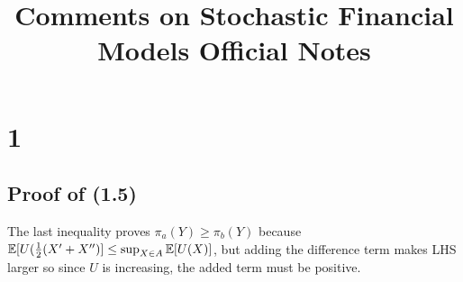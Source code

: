 \documentclass[a4paper]{article}
\begin{document}
\title{Comments on Stochastic Financial Models Official Notes}

\maketitle

\newpage

\tableofcontents

\newpage

\section{1}
\subsection{Proof of (1.5)}
The last inequality proves $\pi_a(Y) \geq \pi_b(Y)$ because $\mathbb{E}[U(\frac{1}{2}(X'+X'')] \leq \sup_{X \in A} \mathbb{E}[U(X)]$, but adding the difference term makes LHS larger so since $U$ is increasing, the added term must be positive.



\iffalse
\begin{equation*}
\begin{aligned}

\end{aligned}
\end{equation*}
\fi
\end{document}
